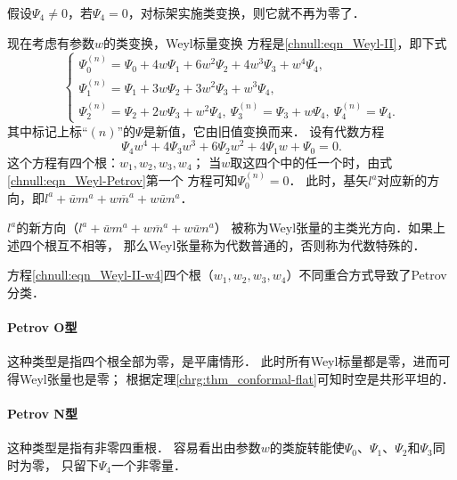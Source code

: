 假设$\Psi_4\neq 0$，若$\Psi_4 = 0$，对标架实施类变换，则它就不再为零了．

现在考虑有参数$w$的类变换，Weyl标量变换
方程是\eqref{chnull:eqn_Weyl-II}，即下式
\begin{equation}\label{chnull:eqn_Weyl-Petrov}
    \begin{cases}
        \Psi_{0}^{(n)}=  \Psi_{0} + 4 w \Psi_{1} + 6 w^2 \Psi_{2}
        + 4 w^3 \Psi_{3} + w^4 \Psi_{4}, \\
        \Psi_{1}^{(n)}=  \Psi_{1} + 3 w \Psi_{2} + 3 w^2 \Psi_{3} + w^3 \Psi_{4}, \\
        \Psi_{2}^{(n)}= \Psi_{2} + 2 w \Psi_{3} + w^2 \Psi_{4}, \
        \Psi_{3}^{(n)}= \Psi_{3} + w \Psi_{4}, \
        \Psi_{4}^{(n)}= \Psi_{4} .
    \end{cases}
\end{equation}
其中标记上标“$(n)$”的$\Psi$是新值，它由旧值变换而来．
设有代数方程
\begin{equation}\label{chnull:eqn_Weyl-II-w4}
    \Psi_{4}w^4 +  4 \Psi_{3}  w^3 + 6  \Psi_{2} w^2
    + 4  \Psi_{1} w + \Psi_{0}= 0.
\end{equation}
这个方程有四个根：$w_1, w_2, w_3 ,w_4$；
当$w$取这四个中的任一个时，由式\eqref{chnull:eqn_Weyl-Petrov}第一个
方程可知$\Psi_0^{(n)}=0$．
此时，基矢$l^a$对应新的方向，即$l^a + \bar{w} m^a + w \overline{m}^a + w\bar{w} n^a $．
\begin{definition}
    $l^a$的新方向（$l^a + \bar{w} m^a + w \overline{m}^a + w\bar{w} n^a $）
    被称为Weyl张量的{\heiti 主类光方向}．如果上述四个根互不相等，
    那么Weyl张量称为{\heiti 代数普通}的，否则称为{\heiti 代数特殊}的．
\end{definition}

方程\eqref{chnull:eqn_Weyl-II-w4}四个根（$w_1, w_2, w_3 ,w_4$）不同重合方式导致了Petrov分类．

\paragraph{Petrov O型}
这种类型是指四个根全部为零，是平庸情形．
此时所有Weyl标量都是零，进而可得Weyl张量也是零；
根据定理\ref{chrg:thm_conformal-flat}可知时空是共形平坦的．


\paragraph{Petrov N型}
这种类型是指有非零四重根．
容易看出由参数$w$的类旋转能使$\Psi_0$、$\Psi_1$、$\Psi_2$和$\Psi_3$同时为零，
只留下$\Psi_4$一个非零量．



